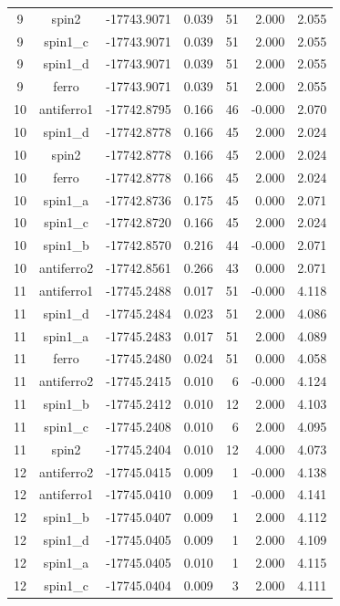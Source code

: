 \begin{longtable}{@{}ccrrrrr@{}}
9 & spin2 & -17743.9071 & 0.039 & 51 & 2.000 & 2.055 \\
9 & spin1\_c & -17743.9071 & 0.039 & 51 & 2.000 & 2.055 \\
9 & spin1\_d & -17743.9071 & 0.039 & 51 & 2.000 & 2.055 \\
9 & ferro & -17743.9071 & 0.039 & 51 & 2.000 & 2.055 \\
\rowcolor{gray!20} 10 & antiferro1 & -17742.8795 & 0.166 & 46 & -0.000 & 2.070 \\
10 & spin1\_d & -17742.8778 & 0.166 & 45 & 2.000 & 2.024 \\
10 & spin2 & -17742.8778 & 0.166 & 45 & 2.000 & 2.024 \\
10 & ferro & -17742.8778 & 0.166 & 45 & 2.000 & 2.024 \\
10 & spin1\_a & -17742.8736 & 0.175 & 45 & 0.000 & 2.071 \\
10 & spin1\_c & -17742.8720 & 0.166 & 45 & 2.000 & 2.024 \\
10 & spin1\_b & -17742.8570 & 0.216 & 44 & -0.000 & 2.071 \\
10 & antiferro2 & -17742.8561 & 0.266 & 43 & 0.000 & 2.071 \\
\rowcolor{gray!20} 11 & antiferro1 & -17745.2488 & 0.017 & 51 & -0.000 & 4.118 \\
11 & spin1\_d & -17745.2484 & 0.023 & 51 & 2.000 & 4.086 \\
11 & spin1\_a & -17745.2483 & 0.017 & 51 & 2.000 & 4.089 \\
11 & ferro & -17745.2480 & 0.024 & 51 & 0.000 & 4.058 \\
11 & antiferro2 & -17745.2415 & 0.010 & 6 & -0.000 & 4.124 \\
11 & spin1\_b & -17745.2412 & 0.010 & 12 & 2.000 & 4.103 \\
11 & spin1\_c & -17745.2408 & 0.010 & 6 & 2.000 & 4.095 \\
11 & spin2 & -17745.2404 & 0.010 & 12 & 4.000 & 4.073 \\
\rowcolor{gray!20} 12 & antiferro2 & -17745.0415 & 0.009 & 1 & -0.000 & 4.138 \\
12 & antiferro1 & -17745.0410 & 0.009 & 1 & -0.000 & 4.141 \\
12 & spin1\_b & -17745.0407 & 0.009 & 1 & 2.000 & 4.112 \\
12 & spin1\_d & -17745.0405 & 0.009 & 1 & 2.000 & 4.109 \\
12 & spin1\_a & -17745.0405 & 0.010 & 1 & 2.000 & 4.115 \\
12 & spin1\_c & -17745.0404 & 0.009 & 3 & 2.000 & 4.111 \\

\end{longtable}
